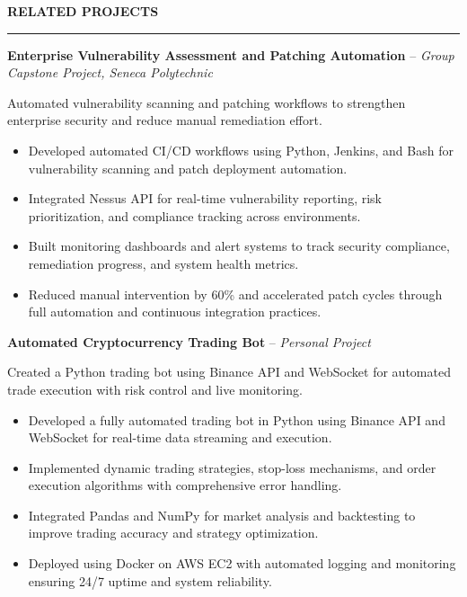 \documentclass[10pt,letterpaper]{article}
\begin{document}
\vspace{6pt}

\textbf{RELATED PROJECTS}\\[-8pt]
\noindent\rule{\textwidth}{1pt}

\vspace{-2pt}

\textbf{Enterprise Vulnerability Assessment and Patching Automation} -- \emph{Group Capstone Project, Seneca Polytechnic}

\vspace{-1pt}

Automated vulnerability scanning and patching workflows to strengthen enterprise security and reduce manual remediation effort.
\vspace{-1pt}
\begin{itemize}
\item Developed automated CI/CD workflows using Python, Jenkins, and Bash for vulnerability scanning and patch deployment automation.
\item Integrated Nessus API for real-time vulnerability reporting, risk prioritization, and compliance tracking across environments.
\item Built monitoring dashboards and alert systems to track security compliance, remediation progress, and system health metrics.
\item Reduced manual intervention by 60\% and accelerated patch cycles through full automation and continuous integration practices.
\end{itemize}

\textbf{Automated Cryptocurrency Trading Bot} -- \emph{Personal Project}

\vspace{-1pt}

Created a Python trading bot using Binance API and WebSocket for automated trade execution with risk control and live monitoring.
\vspace{-1pt}
\begin{itemize}
\item Developed a fully automated trading bot in Python using Binance API and WebSocket for real-time data streaming and execution.
\item Implemented dynamic trading strategies, stop-loss mechanisms, and order execution algorithms with comprehensive error handling.
\item Integrated Pandas and NumPy for market analysis and backtesting to improve trading accuracy and strategy optimization.
\item Deployed using Docker on AWS EC2 with automated logging and monitoring ensuring 24/7 uptime and system reliability.
\end{itemize}
\end{document}
